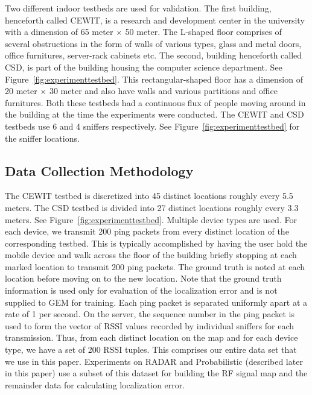Two different indoor testbeds are used for validation. The first building, henceforth called CEWIT, is a research and development center in the university with a dimension of 65 meter $\times$ 50  meter. The L-shaped floor comprises of several obstructions in the form of walls of various types, glass and metal doors, office furnitures, server-rack cabinets etc. The second, building henceforth called CSD, is part of the building housing the computer science department. See Figure~\ref{fig:experimenttestbed}. This rectangular-shaped floor has a dimension of 20 meter $\times$ 30 meter and also have walls and various partitions and office furnitures. Both these testbeds had a continuous flux of people moving around in the building at the time
the experiments were conducted. The CEWIT and CSD testbeds use 6 and 4 sniffers respectively. 
See Figure~\ref{fig:experimenttestbed} for the sniffer locations. 

\subsection{Data Collection Methodology}
\label{subsec:datacollectionmethodology}

The CEWIT testbed is discretized into 45 distinct locations roughly every 5.5 meters. The CSD testbed is divided into 27 distinct locations roughly every 3.3 meters. See Figure~\ref{fig:experimenttestbed}. Multiple device types are used. For each device, we transmit 200 ping packets from every distinct location of the corresponding testbed. This is typically accomplished by having 
the user hold the mobile device and walk across the floor of the building briefly stopping at each marked location to transmit 200 ping packets. The ground truth is noted at each location before moving on to the new location. Note that the ground truth information is used only for evaluation of the localization error and is not supplied to GEM for training. Each ping packet is separated uniformly apart at a rate of 1 per second. On the server, the sequence number in the ping packet is used to form the vector of RSSI values recorded by individual sniffers for each transmission. Thus, from each distinct location on the map and for each device type, we have a set of 200 RSSI tuples. This comprises our entire data set that we use in this paper. Experiments on RADAR and Probabilistic (described later in this paper) use a subset of this dataset for building the RF signal map and the remainder data for calculating localization error. 

